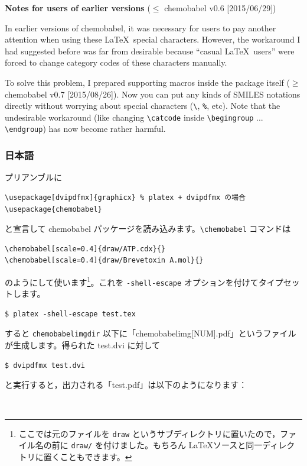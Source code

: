 \documentclass[12pt]{jsarticle}
\begin{document}
\noindent \textbf{Notes for users of earlier versions} ($\le$ \textsf{chemobabel} v0.6 [2015/06/29])

In earlier versions of \textsf{chemobabel}, it was necessary for users to pay another attention when using these \LaTeX\ special characters.
However, the workaround I had suggested before was far from desirable because ``casual \LaTeX\ users'' were forced to change category codes of these characters manually.

To solve this problem, I prepared supporting macros inside the package itself ($\ge$ \textsf{chemobabel} v0.7 [2015/08/26]).
Now you can put any kinds of SMILES notations directly without worrying about special characters (\verb|\|, \verb|%|, etc).
Note that the undesirable workaround (like changing \verb|\catcode| inside \verb|\begingroup| ... \verb|\endgroup|) has now become rather harmful.

\clearpage

\subsubsection{日本語}

プリアンブルに
\begin{verbatim}
\usepackage[dvipdfmx]{graphicx} % platex + dvipdfmx の場合
\usepackage{chemobabel}
\end{verbatim}
と宣言して \textsf{chemobabel} パッケージを読み込みます。\verb|\chemobabel| コマンドは
\begin{verbatim}
\chemobabel[scale=0.4]{draw/ATP.cdx}{}
\chemobabel[scale=0.4]{draw/Brevetoxin A.mol}{}
\end{verbatim}
のようにして使います\footnote{ここでは元のファイルを \texttt{draw} というサブディレクトリに置いたので，ファイル名の前に \texttt{draw/} を付けました。もちろん \LaTeX ソースと同一ディレクトリに置くこともできます。}。これを \verb|-shell-escape| オプションを付けてタイプセットします。
\begin{verbatim}
$ platex -shell-escape test.tex
\end{verbatim}
すると \verb|chemobabelimgdir| 以下に「chemobabelimg[NUM].pdf」というファイルが生成します。得られた test.dvi に対して
\begin{verbatim}
$ dvipdfmx test.dvi
\end{verbatim}
と実行すると，出力される「test.pdf」は以下のようになります：
\begin{figure}[h]
  \centering
   \\
\end{figure}
\end{document}
